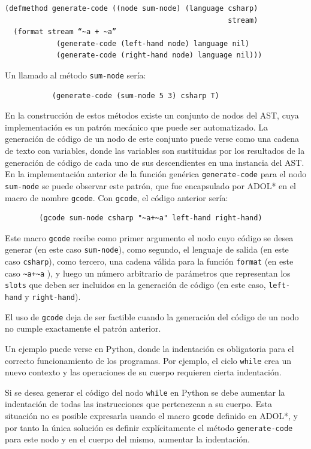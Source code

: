 \begin{verbatim}
(defmethod generate-code ((node sum-node) (language csharp)
                                                    stream)
  (format stream “~a + ~a” 
            (generate-code (left-hand node) language nil)
            (generate-code (right-hand node) language nil)))
\end{verbatim}

Un llamado al método \texttt{sum-node} sería: 
\begin{verbatim}
           (generate-code (sum-node 5 3) csharp T) 
\end{verbatim}

En la construcción de estos métodos existe un conjunto de nodos del AST, cuya implementación es un patrón mecánico que puede ser automatizado. La generación de código de un nodo de este conjunto puede verse como una cadena de texto con variables, donde las variables son sustituidas por los resultados de la generación de código de cada uno de sus descendientes en una instancia del AST. En la implementación anterior de la función genérica \texttt{generate-code} para el nodo \texttt{sum-node} se puede observar este patrón, que fue encapsulado por ADOL* en el macro de nombre \texttt{gcode}. Con \texttt{gcode}, el código anterior sería:

\begin{verbatim}
        (gcode sum-node csharp "~a+~a" left-hand right-hand)
\end{verbatim}

Este macro \texttt{gcode} recibe como primer argumento el nodo cuyo código se desea generar (en este caso \texttt{sum-node}), como segundo, el lenguaje de salida (en este caso \texttt{csharp}), como tercero, una cadena válida para la función \texttt{format} \cite{practical-common-lisp} (en este caso \verb "~a+~a" ), y luego un número arbitrario de parámetros que representan los \texttt{slots} que deben ser incluidos en la generación de código (en este caso, \texttt{left-hand} y \texttt{right-hand}).

El uso de \texttt{gcode} deja de ser factible cuando la generación del código de un nodo no cumple exactamente el patrón anterior.

Un ejemplo puede verse en Python, donde la indentación es obligatoria para el correcto funcionamiento de los programas. Por ejemplo, el ciclo \texttt{while} crea un nuevo contexto y las operaciones de su cuerpo requieren cierta indentación.

Si se desea generar el código del nodo \texttt{while} en Python se debe aumentar la indentación de todas las instrucciones que pertenezcan a su cuerpo. Esta situación no es posible expresarla usando el macro \texttt{gcode} definido en ADOL*, y por tanto la única solución es definir explícitamente el método \texttt{generate-code} para este nodo y en el cuerpo del mismo, aumentar la indentación.

